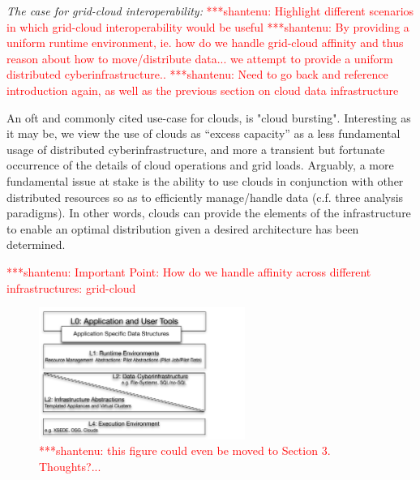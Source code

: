 \documentclass[times]{cpeauth}
\newcommand{\jhanote}[1]{ {\textcolor{red} { ***shantenu: #1 }}}
\newcommand{\jhanote}[1]{}
\begin{document}

{\it The case for grid-cloud interoperability:} \jhanote{Highlight
  different scenarios in which grid-cloud interoperability would be
  useful} \jhanote{By providing a uniform runtime environment, ie.
  how do we handle grid-cloud affinity and thus reason about how to
  move/distribute data... we attempt to provide a uniform distributed
  cyberinfrastructure..} \jhanote{Need to go back and reference
  introduction again, as well as the previous section on cloud data
  infrastructure}

An oft and commonly cited use-case for clouds, is "cloud bursting".
Interesting as it may be, we view the use of clouds as ``excess
capacity'' as a less fundamental usage of distributed
cyberinfrastructure, and more a transient but fortunate occurrence of
the details of cloud operations and grid loads. Arguably, a more
fundamental issue at stake is the ability to use clouds in conjunction
with other distributed resources so as to efficiently manage/handle
data (c.f. three analysis paradigms).  In other words, clouds can
provide the elements of the infrastructure to enable an optimal
distribution given a desired architecture has been determined.

\jhanote{Important Point: How do we handle affinity across different
  infrastructures: grid-cloud}




\begin{figure}[t] \centering
\includegraphics[width=0.6\textwidth]{figures/data-intensive-arch.pdf}
\caption{\jhanote{this figure could even be moved to Section 3. Thoughts?...}}
\label{fig:figures_arch}
\end{figure}
\end{document}
